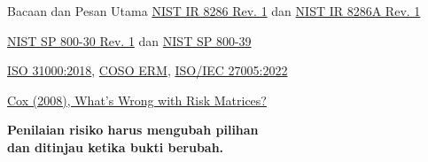 \documentclass[aspectratio=169, table, 12pt]{beamer}
\begin{document}
\begin{frame}{{\Large Bacaan dan Pesan Utama}}
  \vspace{4pt}
  \small
  \href{https://doi.org/10.6028/NIST.IR.8286r1}{NIST IR 8286 Rev. 1} dan
  \href{https://doi.org/10.6028/NIST.IR.8286Ar1}{NIST IR 8286A Rev. 1}\par
  \href{https://doi.org/10.6028/NIST.SP.800-30r1}{NIST SP 800-30 Rev. 1} dan
  \href{https://doi.org/10.6028/NIST.SP.800-39}{NIST SP 800-39}\par
  \href{https://www.iso.org/standard/31000}{ISO 31000:2018},
  \href{https://www.coso.org/erm-framework}{COSO ERM},
  \href{https://www.iso.org/standard/80585.html}{ISO/IEC 27005:2022}\par
  \href{https://doi.org/10.1111/j.1539-6924.2008.01030.x}{Cox (2008), What's Wrong with Risk
  Matrices?}\par
  \vspace{14pt}
  \centering
  \large\textbf{Penilaian risiko harus mengubah pilihan\\dan ditinjau ketika bukti berubah.}
\end{frame}
\end{document}
